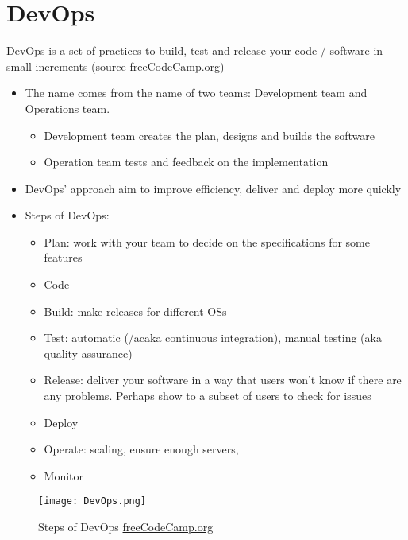 \chapter{DevOps}

DevOps is a set of practices to build, test and release your code / software in small increments (source \href{https://youtu.be/j5Zsa_eOXeY}{freeCodeCamp.org})

\begin{itemize}
	\item The name comes from the name of two teams: Development team and Operations team.
	\begin{itemize}
		\item Development team creates the plan, designs and builds the software
		\item Operation team tests and feedback on the implementation
	\end{itemize}
	\item DevOps' approach aim to improve efficiency, deliver and deploy more quickly
	\item Steps of DevOps:
	\begin{itemize}
		\item Plan: work with your team to decide on the specifications for some features
		\item Code
		\item Build: make releases for different OSs
		\item Test: automatic (/ac{aka} continuous integration), manual testing (\ac{aka} quality assurance)
		\item Release: deliver your software in a way that users won't know if there are any problems. Perhaps show to a subset of users to check for issues
		\item Deploy
		\item Operate: scaling, ensure enough servers, \etc
		\item Monitor
	\end{itemize}
\end{itemize}

\begin{figure}[hbt!]
	\centering
	\texttt{[image: DevOps.png]}
	\caption{Steps of DevOps \href{https://youtu.be/j5Zsa_eOXeY}{freeCodeCamp.org}}
\end{figure}


